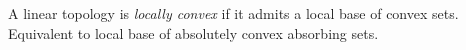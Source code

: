 A linear topology is \emph{locally convex} if it admits a local base of convex sets. Equivalent to local base of absolutely convex absorbing sets.
